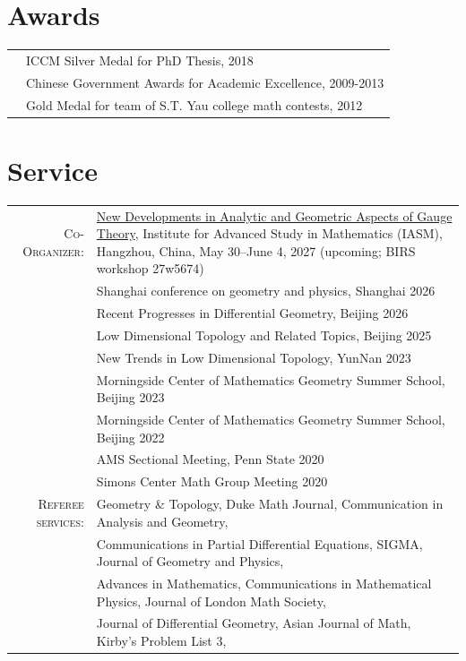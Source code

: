 \documentclass[a4paper,10pt]{article}
\begin{document}
\section*{Awards}
\begin{tabular}{rl}
    &ICCM Silver Medal for PhD Thesis,  \textsc{2018} \\
    &Chinese Government Awards for Academic Excellence,  \textsc{2009-2013} \\
    &Gold Medal for team of S.T. Yau college math contests,  \textsc{2012} \\
\end{tabular}

\section*{Service}
\begin{tabularx}{\textwidth}{@{}rX@{}}
    \textsc{Co-Organizer:} 
    & \href{https://www.birs.ca/events/2027/5-day-workshops/27w5674}{New Developments in Analytic and Geometric Aspects of Gauge Theory}, Institute for Advanced Study in Mathematics (IASM), Hangzhou, China, May 30--June 4, 2027 (upcoming; BIRS workshop 27w5674)\\
    & Shanghai conference on geometry and physics, Shanghai 2026\\
    & Recent Progresses in Differential Geometry, Beijing 2026\\
    & Low Dimensional Topology and Related Topics, Beijing 2025\\
    & New Trends in Low Dimensional Topology, YunNan 2023 \\
    & Morningside Center of Mathematics Geometry Summer School, Beijing 2023 \\
    & Morningside Center of Mathematics Geometry Summer School, Beijing 2022 \\
    & AMS Sectional Meeting, Penn State 2020 \\
    & Simons Center Math Group Meeting 2020 \\
    \textsc{Referee services:} & Geometry \& Topology, Duke Math Journal, Communication in Analysis and Geometry, \\
    & Communications in Partial Differential Equations, SIGMA, Journal of Geometry and Physics, \\
    & Advances in Mathematics, Communications in Mathematical Physics, Journal of London Math Society, \\
    & Journal of Differential Geometry, Asian Journal of Math, Kirby's Problem List 3, \\

\end{tabularx}
\end{document}
